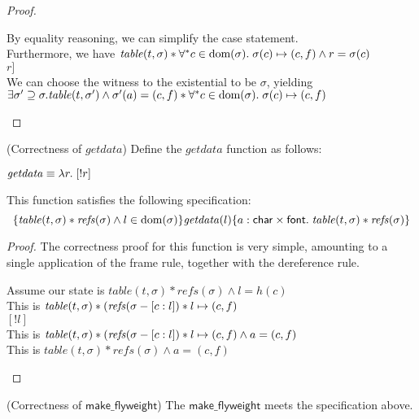 \begin{proof}
\begin{tabbedproof}
\oooo By equality reasoning, we can simplify the case statement. \\
\oooo Furthermore, we have $\mathit{table}(t, \sigma) * \forall^{*}c \in \mbox{dom}({\sigma}).\;\sigma(c) \mapsto (c,f) \land r = \sigma(c)$\\
\oooo $r]$ \\
\oooo We can choose the witness to the existential to be $\sigma$, yielding \\
\ooox $\exists \sigma' \supseteq \sigma. \mathit{table}(t, \sigma') \land \sigma'(a) = (c,f) * \forall^{*}c \in \mbox{dom}({\sigma}).\;\sigma(c) \mapsto (c,f)$ 
\end{tabbedproof}
\end{proof}

\begin{lemma}{(Correctness of $\mathit{getdata}$)}
Define the $\mathit{getdata}$ function as follows:
\begin{tabbing}
\qquad $\mathit{getdata} \equiv \lambda r.\;[!r]$  
\end{tabbing}

\noindent This function satisfies the following specification:
\begin{displaymath}
  \{{\mathit{table}(t, \sigma) * \mathit{refs}(\sigma) \land l \in \mbox{dom}({\sigma})}\}{\mathit{getdata}(l)}\{{a:\mathsf{char} \times \mathsf{font}}.\;{\mathit{table}(t, \sigma) * \mathit{refs}(\sigma)}\}
\end{displaymath}
\end{lemma}

\begin{proof}
The correctness proof for this function is very simple, amounting to a single application
of the frame rule, together with the dereference rule.
\begin{tabbedproof}
\oo Assume our state is $\mathit{table}(t, \sigma) * \mathit{refs}(\sigma) \land l = h(c)$ \\
\oo This is $\mathit{table}(t, \sigma) * (\mathit{refs}(\sigma - [c:l]) * l \mapsto (c,f)$ \\
\oo $[!l]$ \\
\oo This is $\mathit{table}(t, \sigma) * (\mathit{refs}(\sigma - [c:l]) * l \mapsto (c,f) \land a = (c,f)$ \\
\oo This is $\mathit{table}(t, \sigma) * \mathit{refs}(\sigma) \land a = (c, f)$ 
\end{tabbedproof}
\end{proof}

\begin{lemma}{(Correctness of $\mathsf{make\_flyweight}$)}
  The $\mathsf{make\_flyweight}$ meets the specification above. 
\end{lemma}

